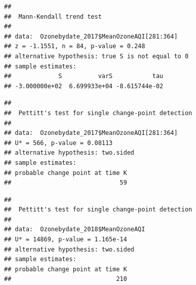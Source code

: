 \documentclass[12pt,]{article}
\newenvironment{Shaded}{\begin{snugshade}}{\end{snugshade}}
\newcommand{\KeywordTok}[1]{\textcolor[rgb]{0.13,0.29,0.53}{\textbf{#1}}}
\newcommand{\DecValTok}[1]{\textcolor[rgb]{0.00,0.00,0.81}{#1}}
\newcommand{\CommentTok}[1]{\textcolor[rgb]{0.56,0.35,0.01}{\textit{#1}}}
\newcommand{\OperatorTok}[1]{\textcolor[rgb]{0.81,0.36,0.00}{\textbf{#1}}}
\newcommand{\NormalTok}[1]{#1}
\begin{document}
\begin{Shaded}
\end{Shaded}

\begin{verbatim}
## 
##  Mann-Kendall trend test
## 
## data:  Ozonebydate_2017$MeanOzoneAQI[281:364]
## z = -1.1551, n = 84, p-value = 0.248
## alternative hypothesis: true S is not equal to 0
## sample estimates:
##             S          varS           tau 
## -3.000000e+02  6.699933e+04 -8.615744e-02
\end{verbatim}

\begin{Shaded}
\end{Shaded}

\begin{verbatim}
## 
##  Pettitt's test for single change-point detection
## 
## data:  Ozonebydate_2017$MeanOzoneAQI[281:364]
## U* = 566, p-value = 0.08113
## alternative hypothesis: two.sided
## sample estimates:
## probable change point at time K 
##                              59
\end{verbatim}

\begin{Shaded}
\end{Shaded}

\begin{verbatim}
## 
##  Pettitt's test for single change-point detection
## 
## data:  Ozonebydate_2018$MeanOzoneAQI
## U* = 14869, p-value = 1.165e-14
## alternative hypothesis: two.sided
## sample estimates:
## probable change point at time K 
##                             210
\end{verbatim}
\end{document}
